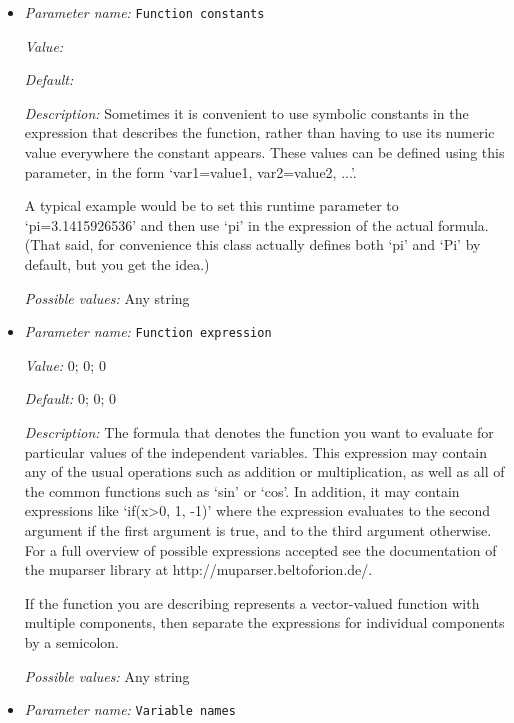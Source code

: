 \begin{itemize}
\item {\it Parameter name:} {\tt Function constants}
\label{parameters:Gravity model/Function/Function constants}
\label{parameters:Gravity_20model/Function/Function_20constants}


{\it Value:} 


{\it Default:} 


{\it Description:} Sometimes it is convenient to use symbolic constants in the expression that describes the function, rather than having to use its numeric value everywhere the constant appears. These values can be defined using this parameter, in the form `var1=value1, var2=value2, ...'.

A typical example would be to set this runtime parameter to `pi=3.1415926536' and then use `pi' in the expression of the actual formula. (That said, for convenience this class actually defines both `pi' and `Pi' by default, but you get the idea.)


{\it Possible values:} Any string
\item {\it Parameter name:} {\tt Function expression}
\label{parameters:Gravity model/Function/Function expression}
\label{parameters:Gravity_20model/Function/Function_20expression}


{\it Value:} 0; 0; 0


{\it Default:} 0; 0; 0


{\it Description:} The formula that denotes the function you want to evaluate for particular values of the independent variables. This expression may contain any of the usual operations such as addition or multiplication, as well as all of the common functions such as `sin' or `cos'. In addition, it may contain expressions like `if(x>0, 1, -1)' where the expression evaluates to the second argument if the first argument is true, and to the third argument otherwise. For a full overview of possible expressions accepted see the documentation of the muparser library at http://muparser.beltoforion.de/.

If the function you are describing represents a vector-valued function with multiple components, then separate the expressions for individual components by a semicolon.


{\it Possible values:} Any string
\item {\it Parameter name:} {\tt Variable names}
\label{parameters:Gravity model/Function/Variable names}
\label{parameters:Gravity_20model/Function/Variable_20names}



\end{itemize}
